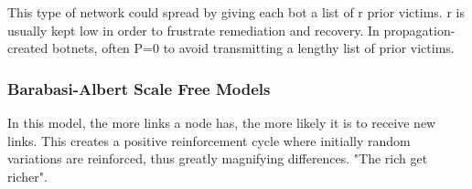 \documentclass{article}
\begin{document}
This type of network could spread by giving each bot a list of r prior victims.  r is usually kept low in order to frustrate remediation and recovery.  In propagation-created botnets, often P=0 to avoid transmitting a lengthy list of prior victims.

\subsubsection{Barabasi-Albert Scale Free Models}

In this model, the more links a node has, the more likely it is to receive new links.  This creates a positive reinforcement cycle where initially random variations are reinforced, thus greatly magnifying differences.  "The rich get richer".
\end{document}
